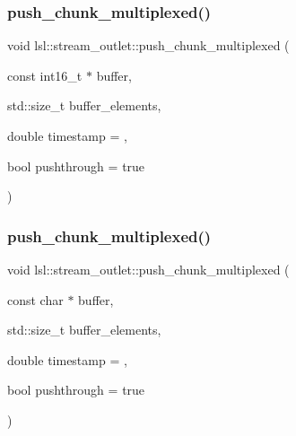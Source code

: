\mbox{\label{classlsl_1_1stream__outlet_a78a48678f40e2bbb591aa0b9da9891d8}} 
\subsubsection{\texorpdfstring{push\+\_\+chunk\+\_\+multiplexed()}{push\_chunk\_multiplexed()}\hspace{0.1cm}{\footnotesize\ttfamily [19/28]}}
{\footnotesize\ttfamily void lsl\+::stream\+\_\+outlet\+::push\+\_\+chunk\+\_\+multiplexed (\begin{DoxyParamCaption}\item[{const int16\+\_\+t $\ast$}]{buffer,  }\item[{std\+::size\+\_\+t}]{buffer\+\_\+elements,  }\item[{double}]{timestamp = {},  }\item[{bool}]{pushthrough = {\ttfamily true} }\end{DoxyParamCaption})\hspace{0.3cm}{\ttfamily [inline]}}

\mbox{\label{classlsl_1_1stream__outlet_ab462e099798c3055b8f976767b239379}} 
\subsubsection{\texorpdfstring{push\+\_\+chunk\+\_\+multiplexed()}{push\_chunk\_multiplexed()}\hspace{0.1cm}{\footnotesize\ttfamily [20/28]}}
{\footnotesize\ttfamily void lsl\+::stream\+\_\+outlet\+::push\+\_\+chunk\+\_\+multiplexed (\begin{DoxyParamCaption}\item[{const char $\ast$}]{buffer,  }\item[{std\+::size\+\_\+t}]{buffer\+\_\+elements,  }\item[{double}]{timestamp = {},  }\item[{bool}]{pushthrough = {\ttfamily true} }\end{DoxyParamCaption})\hspace{0.3cm}{\ttfamily [inline]}}

